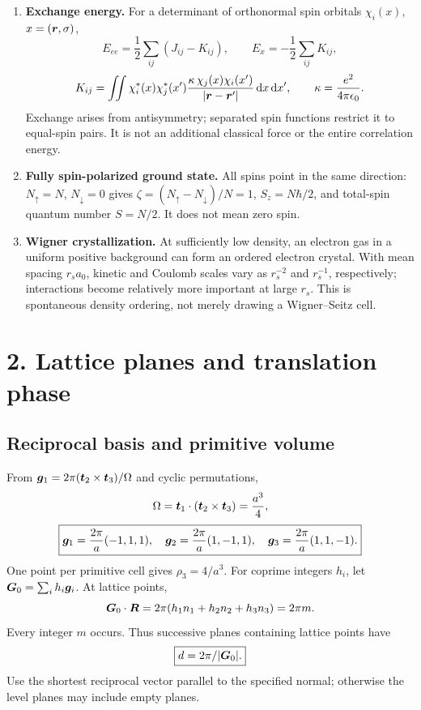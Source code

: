 \begin{enumerate}[label=(\alph*)]
\[
\psi_{n\vct k}(\vct r)=\ee^{\ii\vct k\cdot\vct r}u_{n\vct k}(\vct r),\quad
u_{n\vct k}(\vct r+\vct R)=u_{n\vct k}(\vct r).
\]
Thus $\psi(\vct r+\vct R)=\ee^{\ii\vct k\cdot\vct R}\psi(\vct r)$: $\psi$ is generally quasiperiodic, while $u$ is periodic. The theorem follows from simultaneous diagonalization of the Hamiltonian and commuting translations.
\item \textbf{Exchange energy.}
For a determinant of orthonormal spin orbitals $\chi_i(x)$, $x=(\boldsymbol{r},\sigma)$,
\[
E_{ee}=\frac12\sum_{ij}(J_{ij}-K_{ij}),\qquad E_x=-\frac12\sum_{ij}K_{ij},
\]
\[
K_{ij}=\iint\chi_i^*(x)\chi_j^*(x')
\frac{\kappa\,\chi_j(x)\chi_i(x')}{|\boldsymbol{r}-\boldsymbol{r}'|}\mathop{}\!\mathrm{d} x\mathop{}\!\mathrm{d} x',
\qquad\kappa=\frac{e^2}{4\pi\epsilon_0}.
\]
Exchange arises from antisymmetry; separated spin functions restrict it to equal-spin pairs. It is not an additional classical force or the entire correlation energy.
\item \textbf{Fully spin-polarized ground state.}
All spins point in the same direction: $N_\uparrow=N$, $N_\downarrow=0$ gives $\zeta=(N_\uparrow-N_\downarrow)/N=1$, $S_z=N\hbar/2$, and total-spin quantum number $S=N/2$. It does not mean zero spin.
\item \textbf{Wigner crystallization.}
At sufficiently low density, an electron gas in a uniform positive background can form an ordered electron crystal. With mean spacing $r_sa_0$, kinetic and Coulomb scales vary as $r_s^{-2}$ and $r_s^{-1}$, respectively; interactions become relatively more important at large $r_s$. This is spontaneous density ordering, not merely drawing a Wigner--Seitz cell.
\end{enumerate}

\section*{2. Lattice planes and translation phase}
\subsection*{Reciprocal basis and primitive volume}
From $\boldsymbol{g}_1=2\pi(\boldsymbol{t}_2\times\boldsymbol{t}_3)/\Omega$ and cyclic permutations,
\[
\Omega=\boldsymbol{t}_1\cdot(\boldsymbol{t}_2\times\boldsymbol{t}_3)=\frac{a^3}{4},
\]
\[
\boxed{\boldsymbol{g}_1=\frac{2\pi}{a}(-1,1,1),\quad
\boldsymbol{g}_2=\frac{2\pi}{a}(1,-1,1),\quad
\boldsymbol{g}_3=\frac{2\pi}{a}(1,1,-1).}
\]
One point per primitive cell gives $\rho_3=4/a^3$. For coprime integers $h_i$, let $\boldsymbol{G}_0=\sum_i h_i\boldsymbol{g}_i$. At lattice points,
\[
\boldsymbol{G}_0\cdot\boldsymbol{R}=2\pi(h_1n_1+h_2n_2+h_3n_3)=2\pi m.
\]
Every integer $m$ occurs. Thus successive planes containing lattice points have
\[
\boxed{d=2\pi/|\boldsymbol{G}_0|.}
\]
Use the shortest reciprocal vector parallel to the specified normal; otherwise the level planes may include empty planes.

